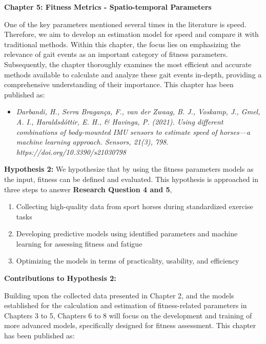 \noindent\textbf{Chapter 5: Fitness Metrics - Spatio-temporal Parameters}

\noindent One of the key parameters mentioned several times in the literature is speed. Therefore, we aim to develop an estimation model for speed and compare it with traditional methods. Within this chapter, the focus lies on emphasizing the relevance of gait events as an important category of fitness parameters. Subsequently, the chapter thoroughly examines the most efficient and accurate methods available to calculate and analyze these gait events in-depth, providing a comprehensive understanding of their importance. This chapter has been published as:


\begin{itemize}
    \item[] \begin{footnotesize}\textit{Darbandi, H., Serra Bragança, F., van der Zwaag, B. J., Voskamp, J., Gmel, A. I., Haraldsdóttir, E. H., \& Havinga, P. (2021). Using different combinations of body-mounted IMU sensors to estimate speed of horses—a machine learning approach. Sensors, 21(3), 798. https://doi.org/10.3390/s21030798}  \end{footnotesize}\end{itemize}
    
\vspace{0.5cm}



\noindent\textbf{\large Hypothesis 2:} We hypothesize that by using the fitness parameters models as the input, fitness can be defined and evaluated. This hypothesis is approached in three steps to answer \textbf{Research Question 4 and 5},


    \begin{enumerate}
\item Collecting high-quality data from sport horses during standardized exercise tasks
\item Developing predictive models using identified parameters and machine learning for assessing fitness and fatigue
\item Optimizing the models in terms of practicality, usability, and efficiency
    \end{enumerate} 

\noindent \textbf{\large Contributions to Hypothesis 2:} 

\vspace{0.1cm}

Building upon the collected data presented in Chapter 2, and the models established for the calculation and estimation of fitness-related parameters in Chapters 3 to 5, Chapters 6 to 8 will focus on the development and training of more advanced models, specifically designed for fitness assessment. This chapter has been published as:

